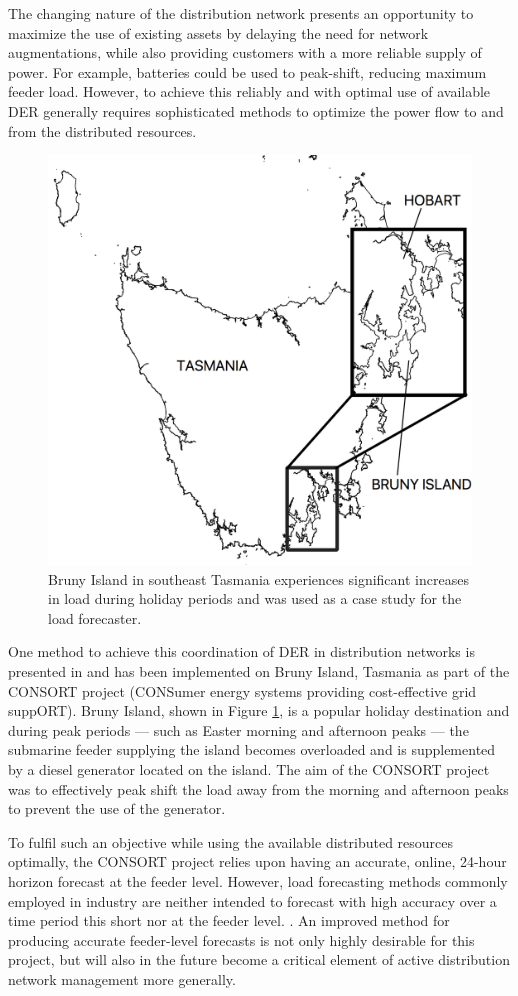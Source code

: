 The changing nature of the distribution network presents an opportunity to maximize the use of existing assets by delaying the need for network augmentations, while also providing customers with a more reliable supply of power.
For example, batteries could be used to peak-shift, reducing maximum feeder load.
However, to achieve this reliably and with optimal use of available DER generally requires sophisticated methods to optimize the power flow to and from the distributed resources.

\begin{figure}[htbp]
	\centerline{\includegraphics[width=.35\textwidth]{images/bruny_island_map.png}}
	\caption{Bruny Island in southeast Tasmania experiences significant increases in load during holiday periods and was used as a case study for the load forecaster.}
	\label{fig:bruny_map}
\end{figure}

One method to achieve this coordination of DER in distribution networks is presented in \cite{Scott2014} and has been implemented on Bruny Island, Tasmania as part of the CONSORT project (CONSumer energy systems providing cost-effective grid suppORT).
Bruny Island, shown in Figure \ref{fig:bruny_map}, is a popular holiday destination and during peak periods --- such as Easter morning and afternoon peaks --- the submarine feeder supplying the island becomes overloaded and is supplemented by a diesel generator located on the island.
The aim of the CONSORT project was to effectively peak shift the load away from the morning and afternoon peaks to prevent the use of the generator.

To fulfil such an objective while using the available distributed resources optimally, the CONSORT project relies upon having an accurate, online, 24-hour horizon forecast at the feeder level.
However, load forecasting methods commonly employed in industry are neither intended to forecast with high accuracy over a time period this short nor at the feeder level. \cite{CIGRE2016}.
An improved method for producing accurate feeder-level forecasts is not only highly desirable for this project, but will also in the future become a critical element of active distribution network management more generally.

